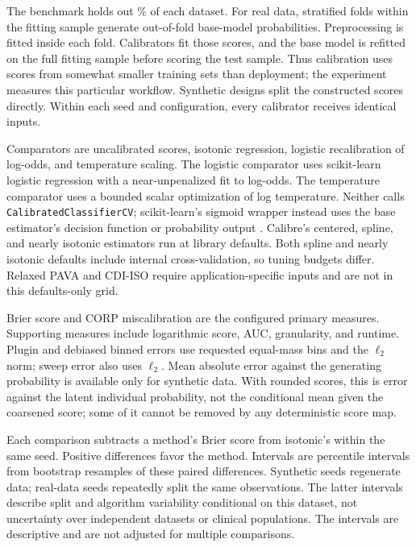\documentclass[11pt]{article}
\begin{document}
The benchmark holds out \BenchTestPercent\% of each dataset. For real data, \BenchFolds{} stratified folds within the fitting sample generate out-of-fold base-model probabilities. Preprocessing is fitted inside each fold. Calibrators fit those scores, and the base model is refitted on the full fitting sample before scoring the test sample. Thus calibration uses scores from somewhat smaller training sets than deployment; the experiment measures this particular workflow. Synthetic designs split the constructed scores directly. Within each seed and configuration, every calibrator receives identical inputs.

Comparators are uncalibrated scores, isotonic regression, logistic recalibration of log-odds, and temperature scaling. The logistic comparator uses scikit-learn logistic regression with a near-unpenalized fit to log-odds. The temperature comparator uses a bounded scalar optimization of log temperature. Neither calls \texttt{CalibratedClassifierCV}; scikit-learn's sigmoid wrapper instead uses the base estimator's decision function or probability output \citep{sklearncalibration}. Calibre's centered, spline, and nearly isotonic estimators run at library defaults. Both spline and nearly isotonic defaults include internal cross-validation, so tuning budgets differ. Relaxed PAVA and CDI-ISO require application-specific inputs and are not in this defaults-only grid.

Brier score and CORP miscalibration are the configured primary measures. Supporting measures include logarithmic score, AUC, granularity, and runtime. Plugin and debiased binned errors use \BenchBins{} requested equal-mass bins and the $\ell_2$ norm; sweep error also uses $\ell_2$. Mean absolute error against the generating probability is available only for synthetic data. With rounded scores, this is error against the latent individual probability, not the conditional mean given the coarsened score; some of it cannot be removed by any deterministic score map.

Each comparison subtracts a method's Brier score from isotonic's within the same seed. Positive differences favor the method. Intervals are percentile intervals from \BenchBootstrap{} bootstrap resamples of these \BenchSeeds{} paired differences. Synthetic seeds regenerate data; real-data seeds repeatedly split the same observations. The latter intervals describe split and algorithm variability conditional on this dataset, not uncertainty over independent datasets or clinical populations. The intervals are descriptive and are not adjusted for multiple comparisons.
\end{document}
